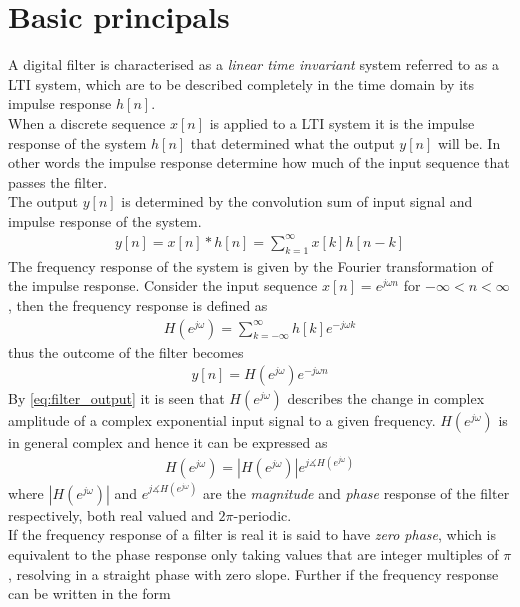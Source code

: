 \section{Basic principals}\label{sec:basic_filter}

A digital filter is characterised as a \textit{linear time invariant} system referred to as a LTI system, which are to be described completely in the time domain by its impulse response $h[n]$. \\
When a discrete sequence $x[n]$ is applied to a LTI system it is the impulse response of the system $h[n]$ that determined what the output $y[n]$ will be. In other words the impulse response determine how much of the input sequence that passes the filter. \\ 
The output $y[n]$ is determined by the convolution sum of input signal and impulse response of the system.
\begin{align}
y[n] = x[n]*h[n] = \sum_{k=1}^{\infty} x[k]h[n-k]
\end{align}    
The frequency response of the system is given by the Fourier transformation of the impulse response. Consider the input sequence $x[n]=e^{j\omega n}$ for $-\infty < n <\infty$, then the frequency response is defined as
\begin{align}\label{eq:freq_res}
H(e^{j\omega})=\sum_{k=-\infty}^{\infty}h[k]e^{-j\omega k}
\end{align}
thus the outcome of the filter becomes 
\begin{align}
y[n]=H(e^{j\omega})e^{-j\omega n} \label{eq:filter_output}
\end{align} 
By \eqref{eq:filter_output} it is seen that $H(e^{j\omega})$ describes the change in complex amplitude of a complex exponential input signal to a given frequency. $H(e^{j\omega})$ is in general complex and hence it can be expressed as
\begin{align}
H(e^{j\omega})=|H(e^{j\omega})|e^{j\measuredangle H(e^{j\omega})}
\end{align}  
where $|H(e^{j\omega})|$ and $e^{j\measuredangle H(e^{j\omega})}$ are the \textit{magnitude} and \textit{phase} response of the filter respectively, both real valued and $2\pi$-periodic.\\ 
If the frequency response of a filter is real it is said to have \textit{zero phase}, which is equivalent to the phase response only taking values that are integer multiples of $\pi$, resolving in a straight phase with zero slope.   Further if the frequency response can be written in the form 
